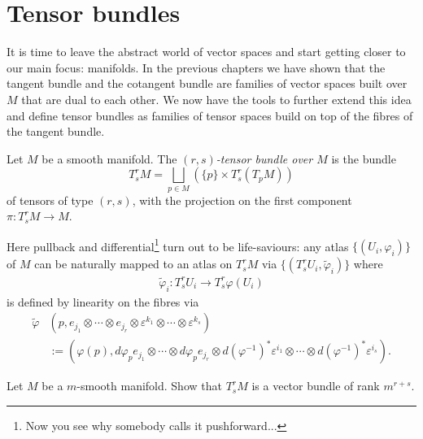 \section{Tensor bundles}

It is time to leave the abstract world of vector spaces and start getting closer to our main focus: manifolds.
In the previous chapters we have shown that the tangent bundle and the cotangent bundle are families of vector spaces built over $M$ that are dual to each other.
We now have the tools to further extend this idea and define tensor bundles as families of tensor spaces build on top of the fibres of the tangent bundle.

\begin{definition}
	Let $M$ be a smooth manifold.
	The \emph{$(r,s)$-tensor bundle over $M$} is the bundle
	\begin{equation}
		T_s^r M = \bigsqcup_{p\in M}\left(\{p\}\times T_s^r(T_p M)\right)
	\end{equation}
	of tensors of type $(r,s)$, with the projection on the first component $\pi:T_s^r M\to M$.
\end{definition}

Here pullback and differential\footnote{Now you see why somebody calls it pushforward...} turn out to be life-saviours:
any atlas $\{(U_i, \varphi_i)\}$ of $M$ can be naturally mapped to an atlas  on $T_s^r M$ via $\{(T_s^r U_i, \widetilde\varphi_i)\}$ where
\begin{align}
	\widetilde\varphi_i : T_s^r U_i \to T_s^r\varphi(U_i)
\end{align}
is defined by linearity on the fibres via
\begin{align}
	\widetilde\varphi & (p, e_{j_1}\otimes\cdots\otimes e_{j_r}\otimes \varepsilon^{k_1}\otimes \cdots\otimes \varepsilon^{k_s})                                                                     \\
	                  & :=(\varphi(p), d\varphi_p e_{j_1}\otimes\cdots\otimes d\varphi_p e_{j_r}\otimes d(\varphi^{-1})^*\varepsilon^{i_1}\otimes \cdots\otimes d(\varphi^{-1})^*\varepsilon^{i_s}).
\end{align}

\begin{exercise}
	Let $M$ be a $m$-smooth manifold.
	Show that $T^r_sM$ is a vector bundle of rank $m^{r+s}$.
\end{exercise}


